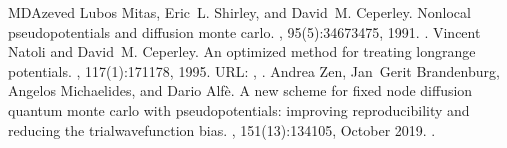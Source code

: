 \documentclass[letterpaper,10pt,english]{sphinxmanual}
\begin{document}
\begin{sphinxthebibliography}{MDAzeved}
Lubos Mitas, Eric L. Shirley, and David M. Ceperley. Nonlocal pseudopotentials and diffusion monte carlo. , 95(5):3467\textendash{}3475, 1991. .
Vincent Natoli and David M. Ceperley. An optimized method for treating long\sphinxhyphen{}range potentials. , 117(1):171\textendash{}178, 1995. URL: , .
Andrea Zen, Jan Gerit Brandenburg, Angelos Michaelides, and Dario Alfè. A new scheme for fixed node diffusion quantum monte carlo with pseudopotentials: improving reproducibility and reducing the trial\sphinxhyphen{}wave\sphinxhyphen{}function bias. , 151(13):134105, October 2019. .
\end{sphinxthebibliography}



\renewcommand{\indexname}{Index}
\printindex
\end{document}
